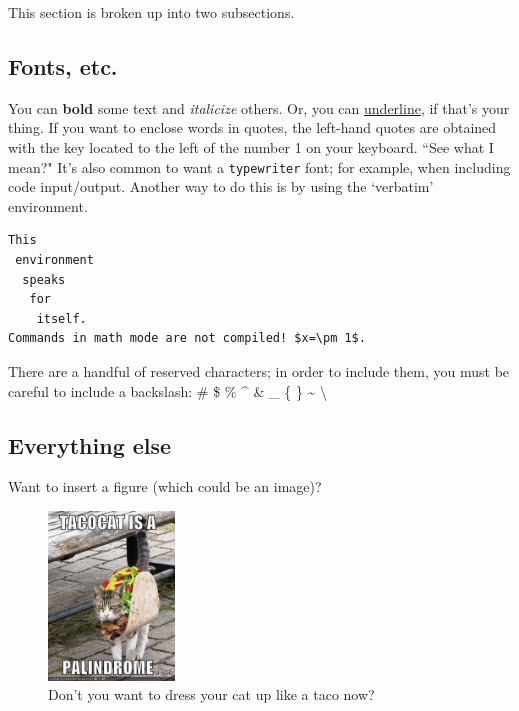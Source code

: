 This section is broken up into two subsections.

\subsection{Fonts, etc.}

You can \textbf{bold} some text and \textit{italicize} others. Or, you can \underline{underline}, if that's your thing. If you want to enclose words in quotes, the left-hand quotes are obtained with the key located to the left of the number 1 on your keyboard. ``See what I mean?" It's also common to want a \texttt{typewriter} font; for example, when including code input/output. Another way to do this is by using the `verbatim' environment.

\begin{verbatim}
This
 environment
  speaks
   for
    itself.
Commands in math mode are not compiled! $x=\pm 1$.
\end{verbatim}

There are a handful of reserved characters; in order to include them, you must be careful to include a backslash:
\# \$ \% \^{} \& \_ \{ \} \~{} \textbackslash

\subsection{Everything else}

Want to insert a figure (which could be an image)?

\begin{figure}[H]
\begin{center}
\includegraphics[width=0.3\textwidth]{tacocat.jpg}
\end{center}
\caption{Don't you want to dress your cat up like a taco now?}
\end{figure}

